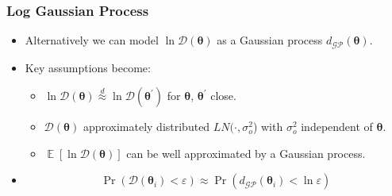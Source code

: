 \documentclass{beamer}
\DeclareMathOperator{\E}{\mathbb{E}}
\begin{document}
\begin{frame}
    \frametitle{Log Gaussian Process}
    \begin{itemize}
        \item Alternatively we can model $\ln \mathcal{D}(\bm{\theta})$ as a
              Gaussian process $d_\mathcal{GP}(\bm{\theta}).$
        \item <2-> Key assumptions become:
              \begin{itemize}
                  \item $\ln \mathcal{D}(\bm{\theta})
                            \overset{d}{\approx} \ln \mathcal{D}(\bm{\theta}^\prime)$ for
                        $\bm{\theta}$, $\bm{\theta}^\prime$ close.
                  \item $\mathcal{D}(\bm{\theta})$ approximately distributed
                        $LN(\cdot, \sigma^2_o$) with $\sigma^2_o$ independent of
                        $\bm{\theta}.$
                  \item $\E[\ln \mathcal{D}(\bm{\theta})]$ can be well approximated by a
                        Gaussian process.
              \end{itemize}
        \item <3- >$$
                  \Pr(\mathcal{D}(\bm{\theta}_i) < \varepsilon)
                  \approx \Pr(d_\mathcal{GP}(\bm{\theta}_i) < \ln\varepsilon)
              $$
    \end{itemize}
\end{frame}
\end{document}
